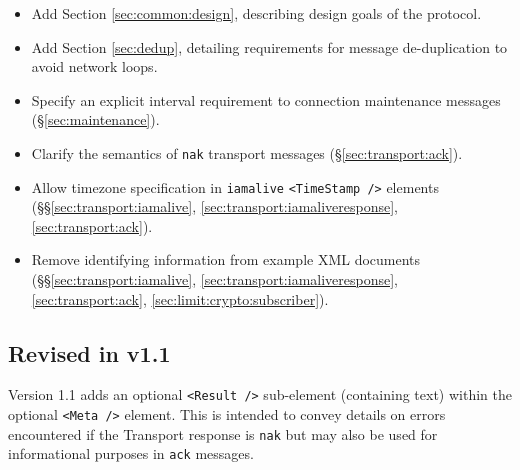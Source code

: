 \documentclass[a4paper,11pt]{ivoa}
\begin{document}
\begin{itemize}
    \item{Add Section \ref{sec:common:design}, describing design goals of the
    protocol.}

    \item{Add Section \ref{sec:dedup}, detailing requirements for message
    de-duplication to avoid network loops.}

    \item{Specify an explicit interval requirement to connection maintenance
    messages (\S\ref{sec:maintenance}).}

    \item{Clarify the semantics of \texttt{nak} transport messages
    (\S\ref{sec:transport:ack}).}

    \item{Allow timezone specification in \texttt{iamalive}
    \texttt{<TimeStamp~/>} elements (\S\S\ref{sec:transport:iamalive},
    \ref{sec:transport:iamaliveresponse}, \ref{sec:transport:ack}).}

    \item{Remove identifying information from example XML documents
    (\S\S\ref{sec:transport:iamalive}, \ref{sec:transport:iamaliveresponse},
    \ref{sec:transport:ack}, \ref{sec:limit:crypto:subscriber}).}
\end{itemize}

\subsection{Revised in v1.1}

Version 1.1 adds an optional \texttt{<Result~/>} sub-element (containing text)
within the optional \texttt{<Meta~/>} element. This is intended to convey
details on errors encountered if the Transport response is \texttt{nak} but
may also be used for informational purposes in \texttt{ack} messages.



\end{document}
